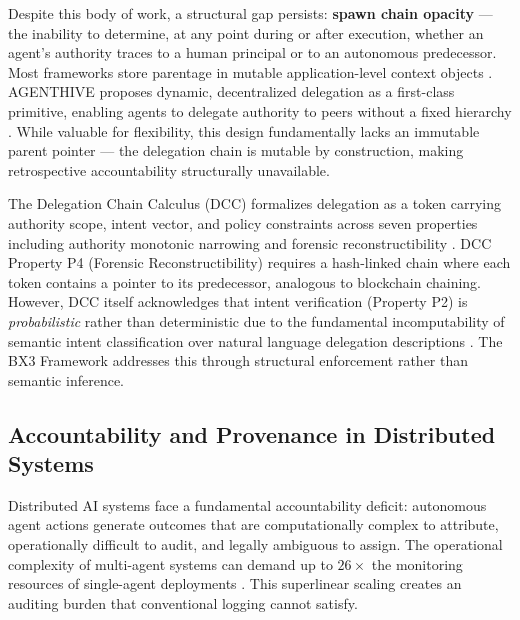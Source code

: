 Despite this body of work, a structural gap persists: \textbf{spawn chain opacity} — the inability to determine, at any point during or after execution, whether an agent's authority traces to a human principal or to an autonomous predecessor. Most frameworks store parentage in mutable application-level context objects \cite{openai-swarm, autogen, langgraph}. AGENTHIVE proposes dynamic, decentralized delegation as a first-class primitive, enabling agents to delegate authority to peers without a fixed hierarchy \cite{agenthive2025}. While valuable for flexibility, this design fundamentally lacks an immutable parent pointer — the delegation chain is mutable by construction, making retrospective accountability structurally unavailable.

The Delegation Chain Calculus (DCC) formalizes delegation as a token carrying authority scope, intent vector, and policy constraints across seven properties including authority monotonic narrowing and forensic reconstructibility \cite{sentinel_agent_2026}. DCC Property P4 (Forensic Reconstructibility) requires a hash-linked chain where each token contains a pointer to its predecessor, analogous to blockchain chaining. However, DCC itself acknowledges that intent verification (Property P2) is \emph{probabilistic} rather than deterministic due to the fundamental incomputability of semantic intent classification over natural language delegation descriptions \cite[Proposition 1]{sentinel_agent_2026}. The BX3 Framework addresses this through structural enforcement rather than semantic inference.

\subsection{Accountability and Provenance in Distributed Systems}
\label{sec:provenance}

Distributed AI systems face a fundamental accountability deficit: autonomous agent actions generate outcomes that are computationally complex to attribute, operationally difficult to audit, and legally ambiguous to assign. The operational complexity of multi-agent systems can demand up to $26\times$ the monitoring resources of single-agent deployments \cite{lumenova_govern_2025}. This superlinear scaling creates an auditing burden that conventional logging cannot satisfy.

